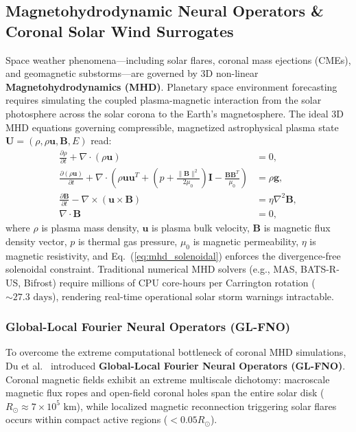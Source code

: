 \subsection{Magnetohydrodynamic Neural Operators \& Coronal Solar Wind Surrogates}
\label{sec:mhd_neural_operators}
Space weather phenomena---including solar flares, coronal mass ejections (CMEs), and geomagnetic substorms---are governed by 3D non-linear \textbf{Magnetohydrodynamics (MHD)}. Planetary space environment forecasting requires simulating the coupled plasma-magnetic interaction from the solar photosphere across the solar corona to the Earth's magnetosphere. The ideal 3D MHD equations governing compressible, magnetized astrophysical plasma state $\mathbf{U} = (\rho, \rho\mathbf{u}, \mathbf{B}, E)$ read:
\begin{align}
    \frac{\partial \rho}{\partial t} + \nabla \cdot (\rho \mathbf{u}) &= 0, \label{eq:mhd_continuity} \\
    \frac{\partial (\rho \mathbf{u})}{\partial t} + \nabla \cdot \left( \rho \mathbf{u} \mathbf{u}^T + \left(p + \frac{\|\mathbf{B}\|^2}{2\mu_0}\right) \mathbf{I} - \frac{\mathbf{B}\mathbf{B}^T}{\mu_0} \right) &= \rho \mathbf{g}, \label{eq:mhd_momentum} \\
    \frac{\partial \mathbf{B}}{\partial t} - \nabla \times (\mathbf{u} \times \mathbf{B}) &= \eta \nabla^2 \mathbf{B}, \label{eq:mhd_induction} \\
    \nabla \cdot \mathbf{B} &= 0, \label{eq:mhd_solenoidal}
\end{align}
where $\rho$ is plasma mass density, $\mathbf{u}$ is plasma bulk velocity, $\mathbf{B}$ is magnetic flux density vector, $p$ is thermal gas pressure, $\mu_0$ is magnetic permeability, $\eta$ is magnetic resistivity, and Eq.~(\ref{eq:mhd_solenoidal}) enforces the divergence-free solenoidal constraint. Traditional numerical MHD solvers (e.g., MAS, BATS-R-US, Bifrost) require millions of CPU core-hours per Carrington rotation ($\sim 27.3\text{ days}$), rendering real-time operational solar storm warnings intractable.

\subsubsection{Global-Local Fourier Neural Operators (GL-FNO)}
To overcome the extreme computational bottleneck of coronal MHD simulations, Du et al.~\cite{du2024glfno} introduced \textbf{Global-Local Fourier Neural Operators (GL-FNO)}. Coronal magnetic fields exhibit an extreme multiscale dichotomy: macroscale magnetic flux ropes and open-field coronal holes span the entire solar disk ($R_\odot \approx 7 \times 10^5\text{ km}$), while localized magnetic reconnection triggering solar flares occurs within compact active regions ($< 0.05 R_\odot$).

